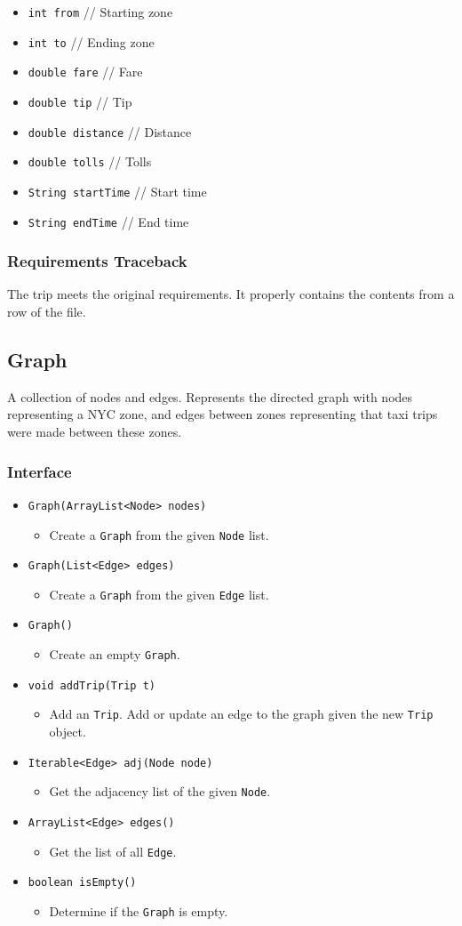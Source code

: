 \documentclass[12pt]{article}
\newcommand{\bi}{\begin{itemize}}
\newcommand{\ei}{\end{itemize}}
\newcommand{\code}[1]{\texttt{#1}}
\begin{document}
\bi
    \item \code{int from} // Starting zone
    \item \code{int to} // Ending zone
    \item \code{double fare} // Fare
	\item \code{double tip} // Tip
	\item \code{double distance} // Distance
	\item \code{double tolls} // Tolls
	\item \code{String startTime} // Start time
	\item \code{String endTime} // End time
\ei

\subsubsection{Requirements Traceback}

The trip meets the original requirements. It properly contains the contents from a row of the file.

\newpage

\subsection{Graph}

A collection of nodes and edges. Represents the directed graph with nodes representing a NYC zone, and edges between zones representing that taxi trips were made between these zones. 

\subsubsection{Interface}

\bi
	\item \code{Graph(ArrayList<Node> nodes)}
	\bi
		\item Create a \code{Graph} from the given \code{Node} list.
	\ei
	\item \code{Graph(List<Edge> edges)}
	\bi
		\item Create a \code{Graph} from the given \code{Edge} list.
	\ei
	\item \code{Graph()}
	\bi
		\item Create an empty \code{Graph}.
	\ei
	\item \code{void addTrip(Trip t)}
	\bi
	    \item Add an \code{Trip}. Add or update an edge to the graph given the new \code{Trip} object. 
	\ei
	\item \code{Iterable<Edge> adj(Node node)}
	\bi
		\item Get the adjacency list of the given \code{Node}.
	\ei
	\item \code{ArrayList<Edge> edges()}
	\bi
		\item Get the list of all \code{Edge}.
	\ei
	\item \code{boolean isEmpty()}
	\bi
		\item Determine if the \code{Graph} is empty.
	\ei
\ei
\end{document}
